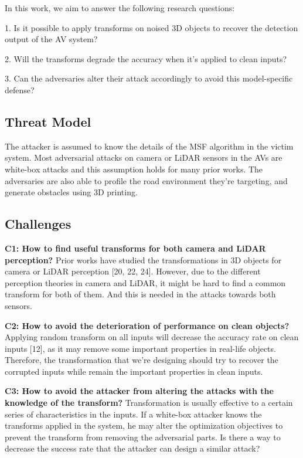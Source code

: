 In this work, we aim to answer the following research
questions:

1. Is it possible to apply transforms on noised 3D objects
to recover the detection output of the AV system?

2. Will the transforms degrade the accuracy when it’s applied to clean inputs?

3. Can the adversaries alter their attack accordingly to avoid
this model-specific defense?

\subsection{Threat Model}
The attacker is assumed to know the details of the MSF algorithm
in the victim system. Most adversarial attacks\cite{4, 7, 9, 19, 23}
on camera or LiDAR sensors in the AVs are white-box attacks
and this assumption holds for many prior works. The adversaries are also able to profile the road environment they’re
targeting, and generate obstacles using 3D printing.

\subsection{Challenges}
\textbf{C1: How to find useful transforms for both camera and
LiDAR perception?}
Prior works have studied the transformations in 3D objects
for camera or LiDAR perception [20, 22, 24]. However, due
to the different perception theories in camera and LiDAR, it
might be hard to find a common transform for both of them.
And this is needed in the attacks towards both sensors.

\textbf{C2: How to avoid the deterioration of performance on clean objects?}
Applying random transform on all inputs will decrease the
accuracy rate on clean inputs [12], as it may remove some
important properties in real-life objects. Therefore, the transformation that we’re designing should try to recover the corrupted
inputs while remain the important properties in clean inputs.

\textbf{C3: How to avoid the attacker from altering the attacks
with the knowledge of the transform?}
Transformation is usually effective to a certain series of
characteristics in the inputs. If a white-box attacker knows the
transforms applied in the system, he may alter the optimization objectives to prevent the transform from removing the
adversarial parts. Is there a way to decrease the success rate
that the attacker can design a similar attack?


